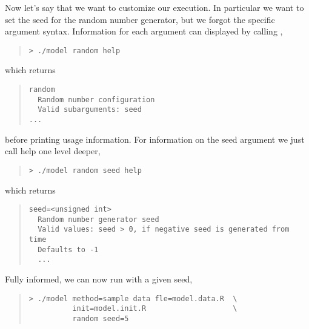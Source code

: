 Now let's say that we want to customize our execution.  In
particular we want to set the seed for the random number generator,
but we forgot the specific argument syntax.  Information for each
argument can displayed by calling ,
%
\begin{quote}
\begin{Verbatim}[fontshape=sl]
> ./model random help
\end{Verbatim}
\end{quote}
%
which returns
%
\begin{quote}
\begin{Verbatim}
random
  Random number configuration
  Valid subarguments: seed
...
\end{Verbatim}
\end{quote}
%
before printing usage information.  For information on the 
seed argument we just call help one level deeper,
%
\begin{quote}
\begin{Verbatim}[fontshape=sl]
> ./model random seed help
\end{Verbatim}
\end{quote}
%
which returns
%
\begin{quote}
\begin{Verbatim}
seed=<unsigned int>
  Random number generator seed
  Valid values: seed > 0, if negative seed is generated from time
  Defaults to -1
  ...
\end{Verbatim}
\end{quote}
%
Fully informed, we can now run with a given seed,
%
\begin{quote}
\begin{Verbatim}[fontshape=sl]
> ./model method=sample data fle=model.data.R  \
          init=model.init.R                    \
          random seed=5
\end{Verbatim}
\end{quote}

